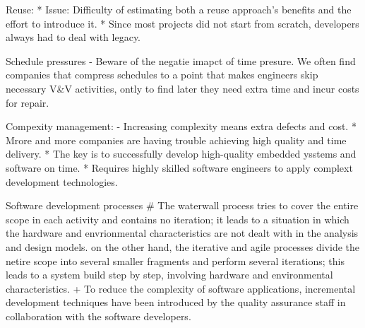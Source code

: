 Reuse:
* Issue: Difficulty of estimating both a reuse approach's benefits and the effort to introduce it.\cite{graaf2003embedded}
* Since most projects did not start from scratch, developers always had to deal with legacy. \cite{graaf2003embedded}








Schedule pressures
- Beware of the negatie imapct of time presure. We often find companies that compress schedules to a point that makes engineers skip necessary V&V activities, ontly to find later they need extra time and incur costs for repair.\cite{ebert2009embedded}


Compexity management:
- Increasing complexity means extra defects and cost. \cite{ebert2009embedded}
* Mrore and more companies are having trouble achieving high quality and time delivery.\cite{graaf2003embedded}
* The key is to successfully develop high-quality embedded ysstems and software on time. \cite{graaf2003embedded}
* Requires highly skilled software engineers to apply complext development technologies. \cite{graaf2003embedded}






Software development processes
# The waterwall process tries to cover the entire scope in each activity and contains no iteration; it leads to a situation in which the hardware and envrionmental characteristics are not dealt with in the analysis and design models. on the other hand, the iterative and agile processes divide the netire scope into several smaller fragments and perform several iterations; this leads to a system build step by step, involving hardware and environmental characteristics.\cite{washizaki2007quality}
+ To reduce the complexity of software applications, incremental development techniques have been introduced by the quality assurance staff in collaboration with the software developers.\cite{trienekens2010quality}